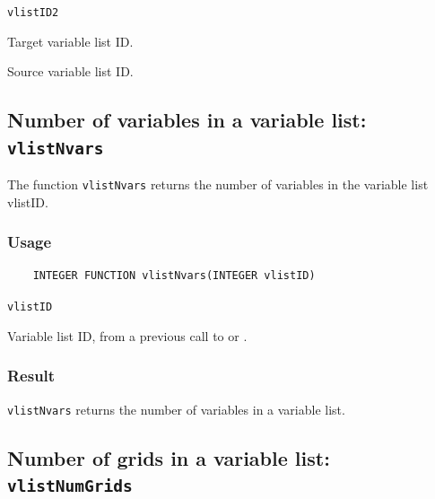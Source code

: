 \hspace*{4mm}\begin{minipage}[]{15cm}
\begin{deflist}{\texttt{vlistID2}\ }
\item[\texttt{vlistID2}]
Target variable list ID.
\item[\texttt{vlistID1}]
Source variable list ID.

\end{deflist}
\end{minipage}


\subsection{Number of variables in a variable list: \texttt{vlistNvars}}
\label{vlistNvars}

The function {\texttt{vlistNvars}} returns the number of variables in the variable list vlistID.

\subsubsection*{Usage}

\begin{verbatim}
    INTEGER FUNCTION vlistNvars(INTEGER vlistID)
\end{verbatim}

\hspace*{4mm}\begin{minipage}[]{15cm}
\begin{deflist}{\texttt{vlistID}\ }
\item[\texttt{vlistID}]
Variable list ID, from a previous call to {} or {}.

\end{deflist}
\end{minipage}

\subsubsection*{Result}

{\texttt{vlistNvars}} returns the number of variables in a variable list.



\subsection{Number of grids in a variable list: \texttt{vlistNumGrids}}
\label{vlistNumGrids}

